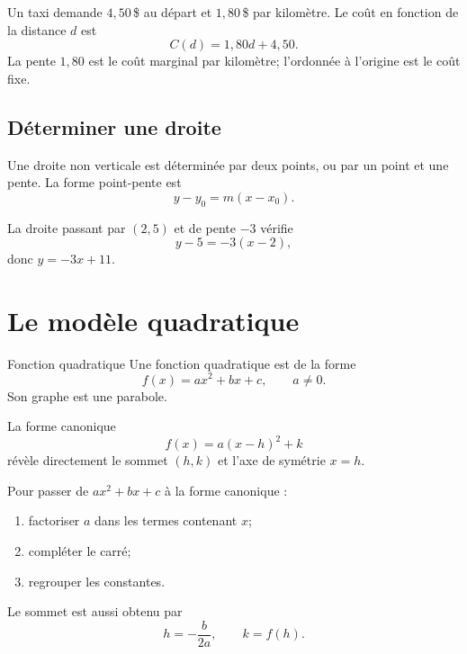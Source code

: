 \documentclass[12pt,a4paper,openany]{book}
\begin{document}
\begin{examplebox}
Un taxi demande $4{,}50\,$\$ au départ et $1{,}80\,$\$ par kilomètre. Le coût en fonction de la distance $d$ est
\[
C(d)=1{,}80d+4{,}50.
\]
La pente $1{,}80$ est le coût marginal par kilomètre; l'ordonnée à l'origine est le coût fixe.
\end{examplebox}

\subsection{Déterminer une droite}

Une droite non verticale est déterminée par deux points, ou par un point et une pente. La forme point-pente est
\[
y-y_0=m(x-x_0).
\]

\begin{examplebox}
La droite passant par $(2,5)$ et de pente $-3$ vérifie
\[
y-5=-3(x-2),
\]
donc $y=-3x+11$.
\end{examplebox}

\section{Le modèle quadratique}

\begin{definition}{Fonction quadratique}{}
Une fonction quadratique est de la forme
\[
f(x)=ax^2+bx+c,
\qquad a\neq0.
\]
Son graphe est une parabole.
\end{definition}

La forme canonique
\[
f(x)=a(x-h)^2+k
\]
révèle directement le sommet $(h,k)$ et l'axe de symétrie $x=h$.

\begin{center}
\end{center}

\begin{methodbox}
Pour passer de $ax^2+bx+c$ à la forme canonique :
\begin{enumerate}
\item factoriser $a$ dans les termes contenant $x$;
\item compléter le carré;
\item regrouper les constantes.
\end{enumerate}
Le sommet est aussi obtenu par
\[
h=-\frac{b}{2a},\qquad k=f(h).
\]
\end{methodbox}
\end{document}
